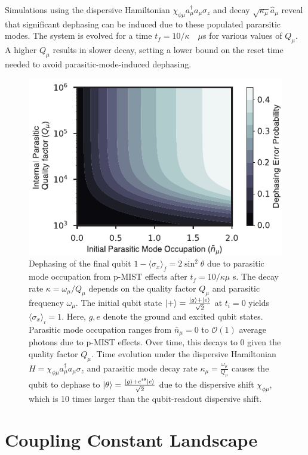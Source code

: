 \documentclass[%
reprint,
superscriptaddress,
 amsmath,amssymb,
 aps,
 prx,
longbibliography,
floatfix,
]{revtex4-2}
\begin{document}
Simulations using the dispersive Hamiltonian $\chi_{\phi\mu}a_\mu^\dagger a_\mu \sigma_z$ and decay $\sqrt{\kappa_\mu}\hat a_\mu$ reveal that significant dephasing can be induced due to these populated pararsitic modes. The system is evolved for a time $t_f=10/\kappa\quad \mu$s for various values of $Q_\mu$. A higher $Q_\mu$ results in slower decay, setting a lower bound on the reset time needed to avoid parasitic-mode-induced dephasing.
\begin{figure}
    \centering
    \includegraphics[width=\linewidth]{Figures/dephasing.pdf}
    \caption{Dephasing of the final qubit $1-\langle \sigma_x \rangle_f = 2\sin^2 \theta$ due to parasitic mode occupation from p-MIST effects after $t_f = 10/\kappa \mu$ s. The decay rate $\kappa=\omega_\mu/Q_\mu$ depends on the quality factor $Q_\mu$ and parasitic frequency $\omega_\mu$. The initial qubit state $\ket{+} = \frac{\ket{g} + \ket{e}}{\sqrt{2}}$ at $t_i = 0$ yields $\langle \sigma_x \rangle_i = 1$. Here, $g, e$ denote the ground and excited qubit states. Parasitic mode occupation ranges from $ \bar{n}_\mu = 0$ to $\mathcal{O}(1)$ average photons due to p-MIST effects. Over time, this decays to 0 given the quality factor $Q_\mu$. Time evolution under the dispersive Hamiltonian $H = \chi_{\phi\mu}a_\mu^\dagger a_\mu\sigma_z$ and parasitic mode decay rate $\kappa_\mu = \frac{\omega_\mu}{Q_\mu}$ causes the qubit to dephase to $\ket{\theta}=\frac{\ket{g} + e^{i\theta}\ket{e}}{\sqrt{2}}$ due to the dispersive shift $\chi_{\phi\mu}$, which is 10 times larger than the qubit-readout dispersive shift. }
    \label{fig:dephasing}
\end{figure}

\section{Coupling Constant Landscape}\label{app:coupling}
\end{document}
